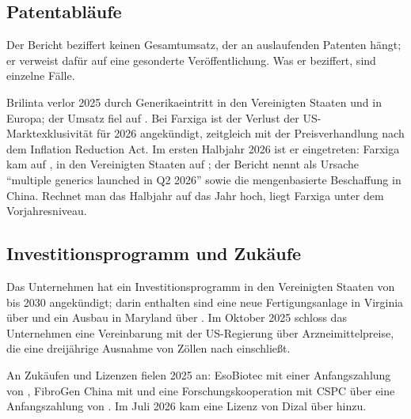 \subsection{Patentabl\"aufe}
\label{sec:loe-azn}

Der Bericht beziffert keinen Gesamtumsatz, der an auslaufenden Patenten
h\"angt; er verweist daf\"ur auf eine gesonderte Ver\"offentlichung.
Was er beziffert, sind einzelne F\"alle.

Brilinta verlor 2025 durch Generikaeintritt in den Vereinigten Staaten und in
Europa; der Umsatz fiel auf \MioUSD{\AznBrilinta}.
Bei Farxiga ist der Verlust der US-Marktexklusivit\"at f\"ur 2026 angek\"undigt,
zeitgleich mit der Preisverhandlung nach dem Inflation Reduction
Act.
Im ersten Halbjahr 2026 ist er eingetreten: Farxiga kam auf
\MioUSD{\AznFarxigaHJ}, in den Vereinigten Staaten auf
\MioUSD{\AznFarxigaUsaHJ}; der Bericht nennt als Ursache
\enquote{multiple generics launched in Q2 2026} sowie die
mengenbasierte Beschaffung in China.
Rechnet man das Halbjahr auf das Jahr hoch, liegt Farxiga
\Pct{\AznFarxigaHJWachstum} unter dem Vorjahresniveau.

\subsection{Investitionsprogramm und Zuk\"aufe}

Das Unternehmen hat ein Investitionsprogramm in den Vereinigten Staaten von
\MrdUSD{\AznInvestitionUsa} bis 2030 angek\"undigt; darin enthalten sind eine
neue Fertigungsanlage in Virginia \"uber \MrdUSD{\AznVirginia} und ein Ausbau
in Maryland \"uber \MrdUSD{\AznMaryland}.
Im Oktober 2025 schloss das Unternehmen eine Vereinbarung mit der
US-Regierung \"uber Arzneimittelpreise, die eine dreij\"ahrige Ausnahme von
Z\"ollen nach \ZollParagraf{} einschlie{\ss}t.

An Zuk\"aufen und Lizenzen fielen 2025 an: EsoBiotec mit einer Anfangszahlung
von \MioUSD{\AznEsoBiotec}, FibroGen China mit \MioUSD{\AznFibroGen} und eine
Forschungskooperation mit CSPC \"uber eine Anfangszahlung von
\MioUSD{\AznCspc}.
Im Juli 2026 kam eine Lizenz von Dizal \"uber \MioUSD{\AznDizal}
hinzu.

